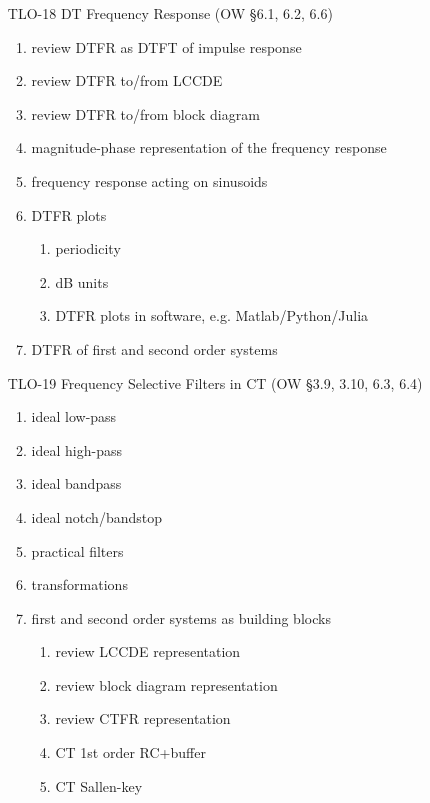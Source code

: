 \begin{enumerate}
\item[TLO-18] DT Frequency Response (OW \S 6.1, 6.2, 6.6)
  \begin{enumerate}
  \item review DTFR as DTFT of impulse response
  \item review DTFR to/from LCCDE
  \item review DTFR to/from block diagram 
  \item magnitude-phase representation of the frequency response
  \item frequency response acting on sinusoids
  \item DTFR plots  
    \begin{enumerate}
    \item periodicity
    \item dB units
    \item DTFR plots in software, e.g. Matlab/Python/Julia
    \end{enumerate}
  \item DTFR of first and second order systems
  \end{enumerate}
  
\item[TLO-19] Frequency Selective Filters in CT (OW \S 3.9, 3.10, 6.3, 6.4) 
  \begin{enumerate}
  \item ideal low-pass
  \item ideal high-pass
  \item ideal bandpass
  \item ideal notch/bandstop
  \item practical filters
  \item transformations
  \item first and second order systems as building blocks
    \begin{enumerate}
    \item review LCCDE representation
    \item review block diagram representation
    \item review CTFR representation
    \item CT 1st order RC+buffer
    \item CT Sallen-key
    \end{enumerate}
  \end{enumerate}
  

\end{enumerate}
